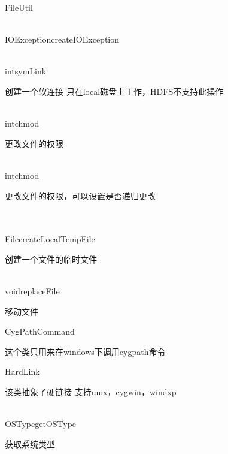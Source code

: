 \begin{XeClass}{FileUtil}
\begin{XeMethod}{\XePrivate\\ }{IOException}{createIOException}
  \end{XeMethod}

  \begin{XeMethod}{\XePublic\\ }{int}{symLink}
       
 创建一个软连接
 只在local磁盘上工作，HDFS不支持此操作

  \end{XeMethod}

  \begin{XeMethod}{\XePublic\\ }{int}{chmod}
       
 更改文件的权限

  \end{XeMethod}

  \begin{XeMethod}{\XePublic\\ }{int}{chmod}
       
 更改文件的权限，可以设置是否递归更改

  \end{XeMethod}

  \begin{XeMethod}{\XePublic\\ \XeFinal\\ }{File}{createLocalTempFile}
       
 创建一个文件的临时文件

  \end{XeMethod}

  \begin{XeMethod}{\XePublic\\ }{void}{replaceFile}
       
 移动文件

  \end{XeMethod}

  \begin{XeInnerClass}{CygPathCommand}
     
 这个类只用来在windows下调用cygpath命令

  \end{XeInnerClass}
  \begin{XeInnerClass}{HardLink}
     
 该类抽象了硬链接
 支持unix，cygwin，windxp

    \begin{XeMethod}{\XePrivate\\ }{OSType}{getOSType}
         
 获取系统类型

    \end{XeMethod}


\end{XeInnerClass}
\end{XeClass}

